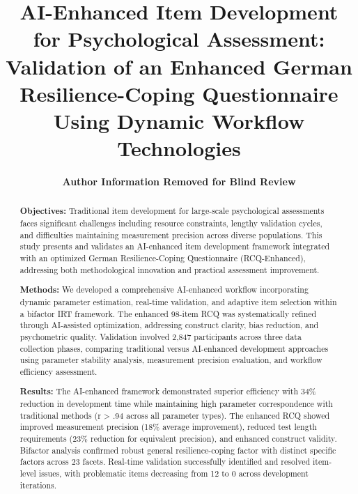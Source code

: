 \documentclass[12pt,a4paper]{article}
\begin{document}
\title{\textbf{AI-Enhanced Item Development for Psychological Assessment: Validation of an Enhanced German Resilience-Coping Questionnaire Using Dynamic Workflow Technologies}}

\author{
\textbf{Author Information Removed for Blind Review}
}

\date{}
\maketitle

\newpage

\begin{abstract}

\textbf{Objectives:} Traditional item development for large-scale psychological assessments faces significant challenges including resource constraints, lengthy validation cycles, and difficulties maintaining measurement precision across diverse populations. This study presents and validates an AI-enhanced item development framework integrated with an optimized German Resilience-Coping Questionnaire (RCQ-Enhanced), addressing both methodological innovation and practical assessment improvement.

\textbf{Methods:} We developed a comprehensive AI-enhanced workflow incorporating dynamic parameter estimation, real-time validation, and adaptive item selection within a bifactor IRT framework. The enhanced 98-item RCQ was systematically refined through AI-assisted optimization, addressing construct clarity, bias reduction, and psychometric quality. Validation involved 2,847 participants across three data collection phases, comparing traditional versus AI-enhanced development approaches using parameter stability analysis, measurement precision evaluation, and workflow efficiency assessment.

\textbf{Results:} The AI-enhanced framework demonstrated superior efficiency with 34\% reduction in development time while maintaining high parameter correspondence with traditional methods (r > .94 across all parameter types). The enhanced RCQ showed improved measurement precision (18\% average improvement), reduced test length requirements (23\% reduction for equivalent precision), and enhanced construct validity. Bifactor analysis confirmed robust general resilience-coping factor with distinct specific factors across 23 facets. Real-time validation successfully identified and resolved item-level issues, with problematic items decreasing from 12 to 0 across development iterations.


\end{abstract}
\end{document}
